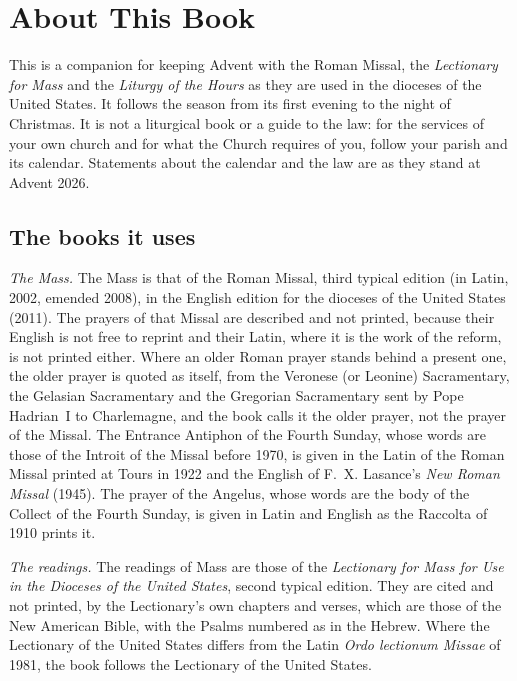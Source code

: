\section{About This Book}\label{sec:scope}

This is a companion for keeping Advent with the Roman Missal, the
\textit{Lectionary for Mass} and the \textit{Liturgy of the Hours} as they are
used in the dioceses of the United States. It follows the season from its first
evening to the night of Christmas. It is not a liturgical book or a guide to
the law: for the services of your own church and for what the Church requires
of you, follow your parish and its calendar. Statements about the calendar and
the law are as they stand at Advent 2026.

\subsection{The books it uses}

\textit{The Mass.} The Mass is that of the Roman Missal, third typical edition
(in Latin, 2002, emended 2008), in the English edition for the dioceses of the
United States (2011). The prayers of that Missal are described and not printed,
because their English is not free to reprint and their Latin, where it is the
work of the reform, is not printed either. Where an older Roman prayer stands
behind a present one, the older prayer is quoted as itself, from the Veronese
(or Leonine) Sacramentary, the Gelasian Sacramentary and the Gregorian
Sacramentary sent by Pope Hadrian~I to Charlemagne, and the book calls it the
older prayer, not the prayer of the Missal. The Entrance Antiphon of the Fourth
Sunday, whose words are those of the Introit of the Missal before 1970, is given
in the Latin of the Roman Missal printed at Tours in 1922 and the English of
F.~X. Lasance's \textit{New Roman Missal} (1945). The prayer of the Angelus,
whose words are the body of the Collect of the Fourth Sunday, is given in Latin
and English as the Raccolta of 1910 prints it.

\textit{The readings.} The readings of Mass are those of the \textit{Lectionary
for Mass for Use in the Dioceses of the United States}, second typical edition.
They are cited and not printed, by the Lectionary's own chapters and verses,
which are those of the New American Bible, with the Psalms numbered as in the
Hebrew. Where the Lectionary of the United States differs from the Latin
\textit{Ordo lectionum Missae} of 1981, the book follows the Lectionary of the
United States.

